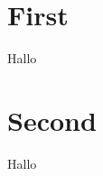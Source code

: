 \documentclass{scrbook}
\begin{document}
  \chapter{First}
  Hallo

  \chapter{Second}
  Hallo
\end{document}

